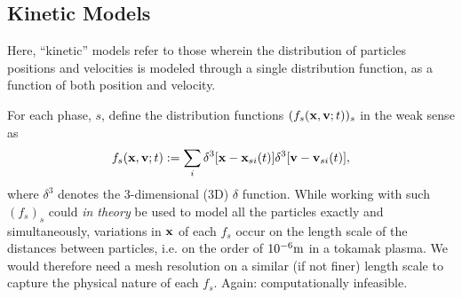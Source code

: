 \subsection{Kinetic Models}
    \line

    \begin{definition}\label{def:kinetic model}
        Here, ``kinetic'' models refer to those wherein the distribution of particles positions and velocities is modeled through a single distribution function, as a function of both position and velocity.
    \end{definition}
    
    \line

    For each phase, $s$, define the distribution functions $(f_{s}(\mathbf{x}, \mathbf{v}; t))_{s}$ in the weak sense as
    \begin{equation}\label{eqn:distribution function definition}
        f_{s}(\mathbf{x}, \mathbf{v}; t)  :=  \sum_{i}\delta^{3}[\mathbf{x} - \mathbf{x}_{si}(t)]\delta^{3}[\mathbf{v} - \mathbf{v}_{si}(t)],
    \end{equation}
    where $\delta^{3}$ denotes the 3-dimensional (3D) $\delta$ function. While working with such $(f_{s})_{s}$ could \emph{in theory} be used to model all the particles exactly and simultaneously, variations in $\mathbf{x}$ of each $f_{s}$ occur on the length scale of the distances between particles, i.e. on the order of $10^{- 6}\mathrm{m}$ in a tokamak plasma. We would therefore need a mesh resolution on a similar (if not finer) length scale to capture the physical nature of each $f_{s}$. Again: computationally infeasible.

